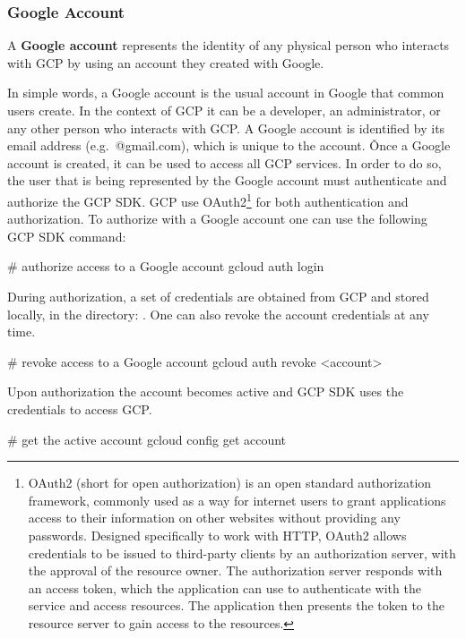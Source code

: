 \subsubsection{Google Account}

A \textbf{Google account} represents the identity of any physical person who interacts with GCP by using an account
they created with Google.
\ed

In simple words, a Google account is the usual account in Google that common users create. In the context of GCP it can
be a developer, an administrator, or any other person who interacts with GCP\@. A Google account is identified by its
email address (e.g.\ @gmail.com), which is unique to the account. \v

Once a Google account is created, it can be used to access all GCP services. In order to do so, the user that is being
represented by the Google account must authenticate and authorize the GCP SDK. GCP use OAuth2\footnote{OAuth2 (short
for open authorization) is an open standard authorization framework, commonly used as a way for internet users to grant
applications access to their information on other websites without providing any passwords. Designed specifically to
work with HTTP, OAuth2 allows credentials to be issued to third-party clients by an authorization server, with the
approval of the resource owner. The authorization server responds with an access token, which the application can use
to authenticate with the service and access resources. The application then presents the token to the resource server
to gain access to the resources.} for both authentication and authorization. To authorize with a Google account one can
use the following GCP SDK command:
\begin{bash}
# authorize access to a Google account
gcloud auth login
\end{bash}

During authorization, a set of credentials are obtained from GCP and stored locally, in the directory:
. One can also revoke the account credentials at any time.

\begin{bash}
# revoke access to a Google account
gcloud auth revoke <account>
\end{bash}

Upon authorization the account becomes active and GCP SDK uses the credentials to access GCP\@.

\begin{bash}
# get the active account
gcloud config get account
\end{bash}

